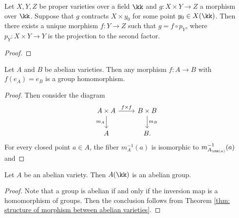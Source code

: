     \begin{lemma}\label{lem: rigidity lemma for X product type}
        Let \(X, Y, Z\) be proper varieties over a field \(\kk\) and \(g:X \times Y \to Z\) a morphism over \(\kk\).
        Suppose that \(g\) contracts \(X \times y_0\) for some point \(y_0 \in X(\kk)\).
        Then there exists a unique morphism \(f: Y \to Z\) such that \(g = f \circ p_Y\), where \(p_Y: X \times Y \to Y\) is the projection to the second factor.
    \end{lemma}
    \begin{proof}
    \end{proof}

    \begin{theorem}\label{thm: structure of morphism between abelian varieties}
        Let \(A\) and \(B\) be abelian varieties. 
        Then any morphism \(f: A \to B\) with \(f(e_A) = e_B\) is a group homomorphism.
    \end{theorem}
    \begin{proof}
        Then consider the diagram
        \[ \begin{tikzcd}
            A \times A \arrow[r, "f \times f"] \arrow[d, "m_A"'] & B \times B \arrow[d, "m_B"] \\
            A & B.
        \end{tikzcd} \]
        For every closed point \(a \in A\), the fiber \(m_A^{-1}(a)\) is isomorphic to \(m_{A_{\rkk(a)}}^{-1}(a)\) and 
    \end{proof}

    \begin{proposition}\label{prop: abelian varieties are abelian groups}
        Let \( A \) be an abelian variety. 
        Then \( A(\kk) \) is an abelian group.
    \end{proposition}
    \begin{proof}
        Note that a group is abelian if and only if the inversion map is a homomorphism of groups.
        Then the conclusion follows from Theorem \ref{thm: structure of morphism between abelian varieties}.
    \end{proof}

